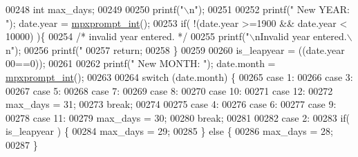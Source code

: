 \begin{DoxyCode}
{{{{{{{{{{{{{{{00248                 \textcolor{keywordtype}{int} max\_days;
00249 
00250                 printf(\textcolor{stringliteral}{"\(\backslash\)n"});
00251 
00252                 printf(\textcolor{stringliteral}{"  New YEAR:  "}); date.year      = \hyperlink{mpx__util_8c_aacc3dfe470919b0bd1133bce90383e18}{mpxprompt_int}();
00253                 \textcolor{keywordflow}{if}( !(date.year >=1900 && date.year < 10000) )\{
00254                         \textcolor{comment}{/* invalid year entered. */}
00255                         printf(\textcolor{stringliteral}{"\(\backslash\)nInvalid year entered.\(\backslash\)n"});
00256                         printf(\textcolor{stringliteral}{"%
00257                         \textcolor{keywordflow}{return};
00258                 \}
00259 
00260                 is\_leapyear = ((date.year%
      00==0));
00261 
00262                 printf(\textcolor{stringliteral}{"  New MONTH: "}); date.month     = \hyperlink{mpx__util_8c_aacc3dfe470919b0bd1133bce90383e18}{mpxprompt_int}();
00263 
00264                 \textcolor{keywordflow}{switch} (date.month) \{
00265                         \textcolor{keywordflow}{case} 1:
00266                         \textcolor{keywordflow}{case} 3:
00267                         \textcolor{keywordflow}{case} 5:
00268                         \textcolor{keywordflow}{case} 7:
00269                         \textcolor{keywordflow}{case} 8:
00270                         \textcolor{keywordflow}{case} 10:
00271                         \textcolor{keywordflow}{case} 12:
00272                                 max\_days = 31;
00273                         \textcolor{keywordflow}{break};
00274 
00275                         \textcolor{keywordflow}{case} 4:
00276                         \textcolor{keywordflow}{case} 6:
00277                         \textcolor{keywordflow}{case} 9:
00278                         \textcolor{keywordflow}{case} 11:
00279                                 max\_days = 30;
00280                         \textcolor{keywordflow}{break};
00281 
00282                         \textcolor{keywordflow}{case} 2:
00283                                 \textcolor{keywordflow}{if}( is\_leapyear ) \{
00284                                         max\_days = 29;
00285                                 \} \textcolor{keywordflow}{else} \{
00286                                         max\_days = 28;
00287                                 \}
}}}}}}}}}}}}}}}}
\end{DoxyCode}
